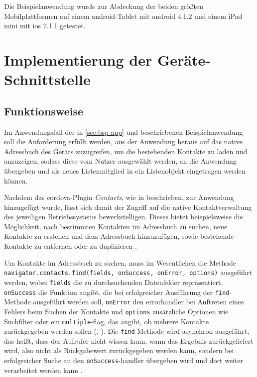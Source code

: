 Die Beispielanwendung wurde zur Abdeckung der beiden größten Mobilplattformen auf einem \gls{android}-Tablet mit \gls{android} 4.1.2 und einem iPad mini mit \gls{ios} 7.1.1 getestet.

\chapter{Implementierung der Geräte-Schnittstelle}	\label{sec:impl} \label{sec:contacts} %
		

\section{Funktionsweise}

Im Anwendungsfall  der in \autoref{sec:bsp-app} und  beschriebenen Beispielanwendung soll die Anforderung erfüllt werden, aus der Anwendung heraus auf das native Adressbuch des Geräts zuzugreifen, um die bestehenden Kontakte zu laden und anzuzeigen, sodass diese vom Nutzer ausgewählt werden, an die Anwendung übergeben und als neues Listenmitglied in ein Listenobjekt eingetragen werden können.

Nachdem das \gls{cordova}-Plugin \emph{Contacts}, wie in  beschrieben, zur Anwendung hinzugefügt wurde, lässt sich damit der Zugriff auf die native Kontaktverwaltung des jeweiligen Betriebssystems bewerkstelligen.
Dieses bietet beispielsweise die Möglichkeit, nach bestimmten Kontakten im Adressbuch zu suchen, neue Kontakte zu erstellen und dem Adressbuch hinzuzufügen, sowie bestehende Kontakte zu entfernen oder zu duplizieren \cite{Cordova_Plugin_Registry_Contacts}.

Um Kontakte im Adressbuch zu suchen, muss im Wesentlichen die Methode \lstinline|navigator.contacts.find(fields, onSuccess, onError, options)| ausgeführt werden, wobei \lstinline|fields| die zu durchsuchenden Datenfelder repräsentiert, \lstinline|onSuccess| die Funktion angibt, die bei erfolgreicher Ausführung der \lstinline|find|-Methode ausgeführt werden soll, \lstinline|onError| den \gls{errorhandler} bei Auftreten eines Fehlers beim Suchen der Kontakte und \lstinline|options| zusätzliche Optionen wie Suchfilter oder ein \lstinline|multiple|-\gls{flag}, das angibt, ob mehrere Kontakte zurückgegeben werden sollen (, ).
Die \lstinline|find|-Methode wird \gls{asynchron} ausgeführt, das heißt, dass der Aufrufer nicht wissen kann, wann das Ergebnis zurückgeliefert wird, also nicht als Rückgabewert zurückgegeben werden kann, sondern bei erfolgreicher Suche an den \og \lstinline|onSuccess|-\gls{handler} übergeben wird und dort weiter verarbeitet werden kann \cite{Cordova_Plugin_Registry_Contacts}.

